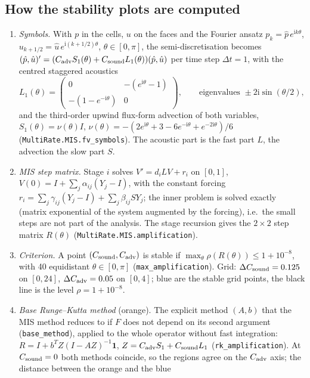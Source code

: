 \documentclass[11pt,a4paper]{article}
\begin{document}
\subsection*{How the stability plots are computed}
\begin{enumerate}
\item \emph{Symbols.} With $p$ in the cells, $u$ on the faces and the Fourier ansatz $p_k=\hat p\,e^{\mathrm ik\theta}$,
  $u_{k+1/2}=\hat u\,e^{\mathrm i(k+1/2)\theta}$, $\theta\in[0,\pi]$, the semi-discretisation becomes
  $(\hat p,\hat u)'=(C_{\rm adv}S_1(\theta)+C_{\rm sound}L_1(\theta))(\hat p,\hat u)$ per time step $\Delta t=1$, with the
  centred staggered acoustics
  \[
   L_1(\theta)=\begin{pmatrix}0&-(e^{\mathrm i\theta}-1)\\-(1-e^{-\mathrm i\theta})&0\end{pmatrix},\qquad
   \text{eigenvalues }\pm2\mathrm i\sin(\theta/2),
  \]
  and the third-order upwind flux-form advection of both variables,
  $S_1(\theta)=\nu(\theta)I$, $\nu(\theta)=-(2e^{\mathrm i\theta}+3-6e^{-\mathrm i\theta}+e^{-2\mathrm i\theta})/6$
  (\texttt{MultiRate.MIS.fv\_symbols}). The acoustic part is the fast part $L$, the advection the slow part $S$.
\item \emph{MIS step matrix.} Stage $i$ solves $V'=d_iLV+r_i$ on $[0,1]$, $V(0)=I+\sum_j\alpha_{ij}(Y_j-I)$, with the
  constant forcing $r_i=\sum_j\gamma_{ij}(Y_j-I)+\sum_j\beta_{ij}SY_j$; the inner problem is solved exactly (matrix
  exponential of the system augmented by the forcing), i.e.\ the small steps are not part of the analysis. The stage
  recursion gives the $2\times2$ step matrix $R(\theta)$ (\texttt{MultiRate.MIS.amplification}).
\item \emph{Criterion.} A point $(C_{\rm sound},C_{\rm adv})$ is stable if $\max_\theta\rho(R(\theta))\le1+10^{-8}$, with
  40 equidistant $\theta\in[0,\pi]$ (\texttt{max\_amplification}). Grid: $\Delta C_{\rm sound}=0.125$ on $[0,24]$,
  $\Delta C_{\rm adv}=0.05$ on $[0,4]$; blue are the stable grid points, the black line is the level $\rho=1+10^{-8}$.
\item \emph{Base Runge--Kutta method} (orange). The explicit method $(A,b)$ that the MIS method reduces to if $F$ does not
  depend on its second argument (\texttt{base\_method}), applied to the whole operator without fast integration:
  $R=I+b^TZ(I-AZ)^{-1}\mathbf 1$, $Z=C_{\rm adv}S_1+C_{\rm sound}L_1$ (\texttt{rk\_amplification}). At $C_{\rm sound}=0$
  both methods coincide, so the regions agree on the $C_{\rm adv}$ axis; the distance between the orange and the blue

\end{enumerate}
\end{document}
